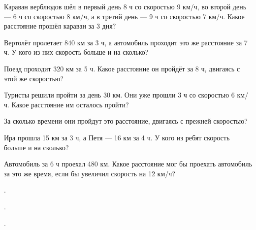 \begin{class}[number=2]
	\begin{listofex}
			\item Караван верблюдов шёл в первый день 8 ч со скоростью 9 км/ч, во второй день --- 6 ч со скоростью 8 км/ч, а в третий день --- 9 ч со скоростью 7 км/ч. Какое расстояние прошёл караван за 3 дня?
		\item Вертолёт пролетает 840 км за 3 ч, а автомобиль проходит это же расстояние за 7 ч. У кого из них скорость больше и на сколько?
		\item Поезд проходит 320 км за 5 ч. Какое расстояние он пройдёт за 8 ч, двигаясь с этой же скоростью?
		\item Туристы решили пройти за день 30 км. Они уже прошли 3 ч со скоростью 6 км/ч. Какое расстояние им осталось пройти?
		\item За сколько времени они пройдут это расстояние, двигаясь с прежней скоростью?
		\item Ира прошла 15 км за 3 ч, а Петя --- 16 км за 4 ч. У кого из ребят скорость больше и на сколько?
		\item Автомобиль за 6 ч проехал 480 км. Какое расстояние мог бы проехать автомобиль за это же время, если бы увеличил скорость на 12 км/ч?
	\end{listofex}
\end{class}

\begin{homework}[number=1]
	\begin{listofex}
		\item .
	\end{listofex}
\end{homework}

\begin{class}[number=3]
	\begin{listofex}
		\item .
	\end{listofex}
\end{class}

\begin{class}[number=4]
	\begin{listofex}
		\item .
	\end{listofex}
\end{class}

